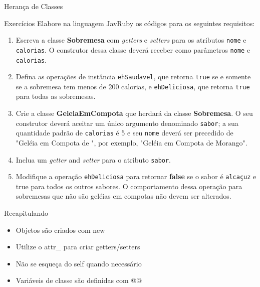 \begin{frame}{Herança de Classes}    
  
 
\end{frame}

\begin{frame}{Exercícios}
Elabore na linguagem JavRuby os códigos para os seguintes requisitos:
    \begin{enumerate}
          \item Escreva a classe \textbf{Sobremesa} com \textit{getters} e \textit{setters} para os atributos \texttt{nome} e \texttt{calorias}. O construtor dessa classe deverá receber como parâmetros \texttt{nome} e \texttt{calorias}.      
          \item Defina as operações de instância \texttt{ehSaudavel}, que retorna \texttt{true} se e somente se a sobremesa tem menos de 200 calorias, e \texttt{ehDeliciosa}, que retorna \texttt{true} para todas as sobremesas.
          \item Crie a classe \textbf{GeleiaEmCompota} que herdará da classe \textbf{Sobremesa}. O seu construtor deverá aceitar um único argumento denominado \texttt{sabor};  a sua quantidade padrão de \texttt{calorias} é 5 e seu \texttt{nome} deverá ser precedido de "Geléia em Compota de ", por exemplo, "Geléia em Compota de Morango".
          \item Inclua um \textit{getter} and \textit{setter} para o atributo \texttt{sabor}.   
          \item Modifique a operação \texttt{ehDeliciosa} para retornar \textbf{false} se o sabor é \texttt{alcaçuz} e true para todos os outros sabores. O comportamento dessa operação para sobremesas que não são geléias em compotas não devem ser alterados.
       \end{enumerate}  
    
\end{frame}


\begin{frame}[fragile,t]{Recapitulando}
  \begin{itemize}
    \item Objetos são criados com \alert{new}
    \item Utilize o \alert{attr\_} para criar getters/setters
    \item Não se esqueça do \alert{self} quando necessário
    \item Variáveis de classe são definidas com \alert{@@}
  \end{itemize}
\end{frame}



